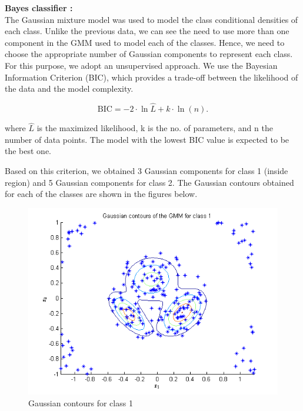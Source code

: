 \documentclass{article}
\begin{document}
\begin{flushleft}

\textbf{Bayes classifier :}  \\[10pt]
The Gaussian mixture model was used to model the class conditional densities of each class. Unlike the previous data, we can see the need to use more than one component in the GMM used to model each of the classes. Hence, we need to choose the appropriate number of Gaussian components to represent each class.
\\[10pt]

For this purpose, we adopt an unsupervised approach. We use the Bayesian Information Criterion (BIC), which provides a trade-off between the likelihood of the data and the model complexity.

\[ \mathrm{BIC} = {-2 \cdot \ln{\hat L} + k \cdot \ln(n)}. \] 


where $\hat L$ is the maximized likelihood, k is the no. of parameters, and n the number of data points. The model with the lowest BIC value is expected to be the best one.


Based on this criterion, we obtained 3 Gaussian components for class 1 (inside region) and 5 Gaussian components for class 2. The Gaussian contours obtained for each of the classes are shown in the figures below.



\end{flushleft}


\begin{figure}[H]
\centering
\includegraphics[width=\linewidth]{Classification/nonlinearlySeparable/gmm_1.png}
\caption{Gaussian contours for class 1}
\end{figure}
\end{document}
